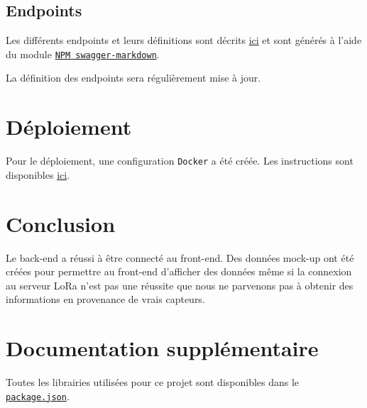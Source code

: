 \subsection{Endpoints}

Les différents endpoints et leurs définitions sont décrits \href{https://github.com/heig-vd-iot2018/back-end/blob/master/dev/iot-rest-api/api/swagger/swagger.md}{ici} et sont générés à l'aide du module \href{https://www.npmjs.com/package/swagger-markdown}{\texttt{NPM swagger-markdown}}.

La définition des endpoints sera régulièrement mise à jour.   
\clearpage

\section{Déploiement}

Pour le déploiement, une configuration \texttt{Docker} a été créée. Les instructions sont disponibles \href{https://github.com/heig-vd-iot2018/back-end/blob/master/dev/README.md}{ici}.

\section{Conclusion}

Le back-end a réussi à être connecté au front-end. Des données mock-up ont été créées pour permettre au front-end d'afficher des données même si la connexion au serveur LoRa n'est pas une réussite que nous ne parvenons pas à obtenir des informations en provenance de vrais capteurs.
   
\section{Documentation supplémentaire}

Toutes les librairies utilisées pour ce projet sont disponibles dans le \href{https://github.com/heig-vd-iot2018/back-end/blob/master/dev/iot-rest-api/package.json}{\texttt{package.json}}.
\clearpage